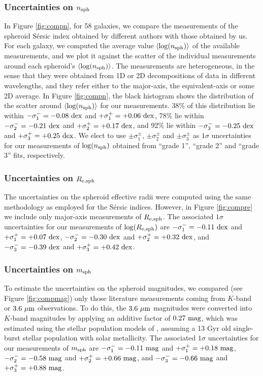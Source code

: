 \documentclass[preprint2]{emulateapj}
\begin{document}
\subsubsection{Uncertainties on $n_{\rm sph}$}
In Figure \ref{fig:compn}, for 58 galaxies, 
we compare the measurements of the spheroid S\'ersic index obtained by different authors 
with those obtained by us. 
For each galaxy, we computed the average value $\langle \log(n_{\rm sph}) \rangle$ of the available measurements, 
and we plot it against the scatter of the individual measurements around each spheroid's $\langle \log(n_{\rm sph}) \rangle$.
The measurements are heterogeneous, 
in the sense that they were obtained from 1D or 2D decompositions of data in different wavelengths, 
and they refer either to the major-axis, the equivalent-axis or some 2D average.
In Figure \ref{fig:compn}, the black histogram shows the distribution of the scatter around $\langle \log(n_{\rm sph}) \rangle$ 
for our measurements. 
38\% of this distribution lie within $-\sigma_1^- = -0.08~\rm dex$ and $+\sigma_1^+ = +0.06~\rm dex$, 
78\% lie within $-\sigma_2^- = -0.21~\rm dex$ and $+\sigma_2^+ = +0.17~\rm dex$,
and 92\% lie within $-\sigma_3^- = -0.25~\rm dex$ and $+\sigma_3^+ = +0.25~\rm dex$. 
We elect to use $\pm \sigma_1^\pm$, $\pm \sigma_2^\pm$ and $\pm \sigma_3^\pm$ as $1\sigma$ uncertainties 
for our measurements of $\log(n_{\rm sph})$ obtained from ``grade 1'', ``grade 2'' and ``grade 3'' fits, respectively. \\

\subsubsection{Uncertainties on $R_{\rm e,sph}$}
The uncertainties on the spheroid effective radii were computed using the same methodology as employed for the S\'ersic indices. 
However, in Figure \ref{fig:compre} we include only major-axis measurements of $R_{\rm e,sph}$. 
The associated $1\sigma$ uncertainties for our measurements of $\log(R_{\rm e,sph})$ are 
$-\sigma_1^- = -0.11~\rm dex$ and $+\sigma_1^+ = +0.07~\rm dex$, 
$-\sigma_2^- = -0.30~\rm dex$ and $+\sigma_2^+ = +0.32~\rm dex$,
and $-\sigma_3^- = -0.39~\rm dex$ and $+\sigma_3^+ = +0.42~\rm dex$. 

\subsubsection{Uncertainties on $m_{\rm sph}$}
To estimate the uncertainties on the spheroid magnitudes, 
we compared (see Figure \ref{fig:compmag}) only those literature measurements coming from $K$-band or $3.6~\rm \mu m$ observations.
To do this, the $3.6~\rm \mu m$ magnitudes were converted into $K$-band magnitudes by applying an additive factor of $0.27\rm~mag$, 
which was estimated using the stellar population models of \cite{worthey1994},
assuming a 13 Gyr old single-burst stellar population with solar metallicity. 
The associated $1\sigma$ uncertainties for our measurements of $m_{\rm sph}$ are 
$-\sigma_1^- = -0.11~\rm mag$ and $+\sigma_1^+ = +0.18~\rm mag$, 
$-\sigma_2^- = -0.58~\rm mag$ and $+\sigma_2^+ = +0.66~\rm mag$,
and $-\sigma_3^- = -0.66~\rm mag$ and $+\sigma_3^+ = +0.88~\rm mag$. 
\end{document}
